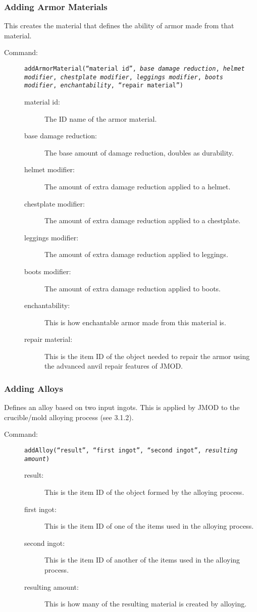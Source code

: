 \documentclass[letterpaper,titlepage,12pt]{article}
\begin{document}
\subsubsection{Adding Armor Materials}

This creates the material that defines the ability of armor made from that material.

\begin{description}
\item[Command:] \texttt{addArmorMaterial(``\emph{material id}'', \emph{base damage reduction}, \emph{helmet modifier}, \emph{chestplate modifier}, \emph{leggings modifier}, \emph{boots modifier}, \emph{enchantability}, ``\emph{repair material}'')}


\begin{description}
\item [material id:] The ID name of the armor material.
\item [base damage reduction:] The base amount of damage reduction, doubles as durability.
\item [helmet modifier:] The amount of extra damage reduction applied to a helmet.
\item [chestplate modifier:] The amount of extra damage reduction applied to a chestplate.
\item [leggings modifier:] The amount of extra damage reduction applied to leggings.
\item [boots modifier:] The amount of extra damage reduction applied to boots.
\item [enchantability:] This is how enchantable armor made from this material is.
\item [repair material:] This is the item ID of the object needed to repair the armor using the advanced anvil repair features of JMOD.
\end{description}
\end{description}

\subsubsection{Adding Alloys}

Defines an alloy based on two input ingots.  This is applied by JMOD to the crucible/mold alloying process (see 3.1.2).

\begin{description}
\item[Command:] \texttt{addAlloy(``\emph{result}'', ``\emph{first ingot}'', ``\emph{second ingot}'', \emph{resulting amount})}

\begin{description}
\item [result:] This is the item ID of the object formed by the alloying process.
\item [first ingot:] This is the item ID of one of the items used in the alloying process.
\item [second ingot:] This is the item ID of another of the items used in the alloying process.
\item [resulting amount:] This is how many of the resulting material is created by alloying.
\end{description}
\end{description}
\end{document}
